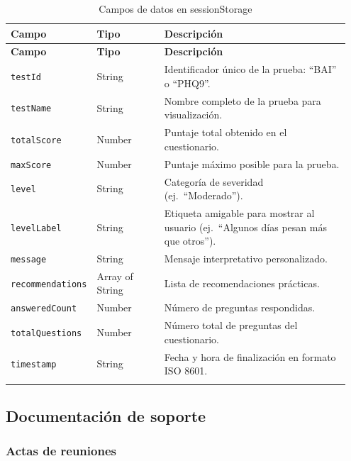 \begin{longtable}{p{0.20\linewidth} p{0.20\linewidth} p{0.55\linewidth}}
\toprule
\rowcolor{tableheader!20}
\textbf{Campo} & \textbf{Tipo} & \textbf{Descripción} \\
\midrule
\endfirsthead
\rowcolor{tableheader!20}
\textbf{Campo} & \textbf{Tipo} & \textbf{Descripción} \\
\midrule
\endhead
\bottomrule
\endfoot
\texttt{testId}          & String          & Identificador único de la prueba: ``BAI'' o ``PHQ9''. \\
\texttt{testName}        & String          & Nombre completo de la prueba para visualización. \\
\texttt{totalScore}      & Number          & Puntaje total obtenido en el cuestionario. \\
\texttt{maxScore}        & Number          & Puntaje máximo posible para la prueba. \\
\texttt{level}           & String          & Categoría de severidad (ej.\ ``Moderado''). \\
\texttt{levelLabel}      & String          & Etiqueta amigable para mostrar al usuario (ej.\ ``Algunos días pesan más que otros''). \\
\texttt{message}         & String          & Mensaje interpretativo personalizado. \\
\texttt{recommendations} & Array of String & Lista de recomendaciones prácticas. \\
\texttt{answeredCount}   & Number          & Número de preguntas respondidas. \\
\texttt{totalQuestions}  & Number          & Número total de preguntas del cuestionario. \\
\texttt{timestamp}       & String          & Fecha y hora de finalización en formato ISO 8601. \\
\bottomrule
\caption{Campos de datos en sessionStorage}
\label{tab:sessionstorage}
\end{longtable}

\subsection{Documentación de soporte}
\label{sec:documentacion_soporte}

\subsubsection{Actas de reuniones}

